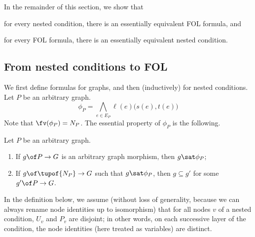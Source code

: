 In the remainder of this section, we show that
%
\begin{inumerate}
\item for every nested condition, there is an essentially equivalent FOL formula, and
\item for every FOL formula, there is an essentially equivalent nested condition.
\end{inumerate}
%
\subsection{From nested conditions to FOL}

We first define formulas for graphs, and then (inductively) for nested conditions. Let $P$ be an arbitrary graph.
%
\[ \phi_P = \textstyle
 \bigwedge_{e\in E_P} \ell(e)\bigl(s(e),t(e)\bigr)
\]
%
Note that $\fv(\phi_P)=N_P$. The essential property of $\phi_P$ is the following.
%
\begin{proposition}\label{prop:graph formula}
Let $P$ be an arbitrary graph.
\begin{enumerate}
\item If $g\of P\to G$ is an arbitrary graph morphism, then $g\sat \phi_P$;
\item If $g\of \tupof{N_P}\to G$ such that $g\sat \phi_P$, then $g\subseteq g'$ for some $g'\of P\to G$.
\end{enumerate}
\end{proposition}
%
In the definition below, we assume (without loss of generality, because we can always rename node identities up to isomorphism) that for all nodes $v$ of a nested condition, $U_v$ and $P_v$ are disjoint; in other words, on each successive layer of the condition, the node identities (here treated as variables) are distinct. 

